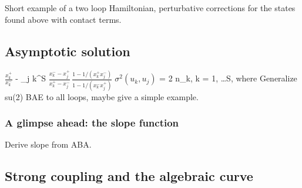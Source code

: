 Short example of a two loop Hamiltonian, perturbative corrections for the states found above with contact terms.

\subsection{Asymptotic solution}

\beq
	 \log \( \frac{x_k^+}{x_k^-} \) - \sum_{j \neq k}^S  \log \( \frac{x_k^- - x_j^+}{x_k^+ - x_j^-} \, \frac{1 - 1/(x_k^+ x_j^-)}{1 - 1/(x_k^- x_j^+)} \; \sigma^2(u_k, u_j) \) = 2 \pi n_k, \;\;\; k = 1, \dots S,
\eeq
where 
Generalize su(2) BAE to all loops, maybe give a simple example. 

\subsubsection{A glimpse ahead: the slope function}

Derive slope from ABA.

\subsection{Strong coupling and the algebraic curve}



